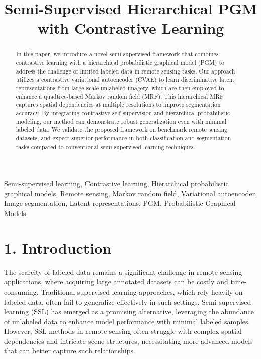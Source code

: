 \documentclass[conference]{IEEEtran}
\title{Semi-Supervised Hierarchical PGM with Contrastive Learning}
\author{
    \IEEEauthorblockN{Leonard Niyitegeka}
    \IEEEauthorblockA{Carnegie Mellon University Africa\\
    Email: lniyiteg@andrew.cmu.edu}
    \and
    \IEEEauthorblockN{Jules Udahemuka}
    \IEEEauthorblockA{Carnegie Mellon University Africa\\
    Email: judahemu@andrew.cmu.edu}
}
\begin{document}
\maketitle

\begin{abstract}
    In this paper, we introduce a novel semi-supervised framework that combines contrastive learning with a hierarchical probabilistic graphical model (PGM) to address the challenge of limited labeled data in remote sensing tasks. Our approach utilizes a contrastive variational autoencoder (CVAE) to learn discriminative latent representations from large-scale unlabeled imagery, which are then employed to enhance a quadtree-based Markov random field (MRF). This hierarchical MRF captures spatial dependencies at multiple resolutions to improve segmentation accuracy. By integrating contrastive self-supervision and hierarchical probabilistic modeling, our method can demonstrate robust generalization even with minimal labeled data. We validate the proposed framework on benchmark remote sensing datasets, and expect superior performance in both classification and segmentation tasks compared to conventional semi-supervised learning techniques.
\end{abstract}
\vspace{0.5cm}

\begin{IEEEkeywords}
    Semi-supervised learning, Contrastive learning, Hierarchical probabilistic graphical models, Remote sensing, Markov random field, Variational autoencoder, Image segmentation, Latent representations, PGM, Probabilistic Graphical Models.
\end{IEEEkeywords}

\section*{1. Introduction}

The scarcity of labeled data remains a significant challenge in remote sensing applications, where acquiring large annotated datasets can be costly and time-consuming\cite{paris2023remote}. Traditional supervised learning approaches, which rely heavily on labeled data, often fail to generalize effectively in such settings. Semi-supervised learning (SSL) has emerged as a promising alternative, leveraging the abundance of unlabeled data to enhance model performance with minimal labeled samples\cite{patel2022evaluating}. However, SSL methods in remote sensing often struggle with complex spatial dependencies and intricate scene structures, necessitating more advanced models that can better capture such relationships\cite{pastorino2021semantic}.
\end{document}
